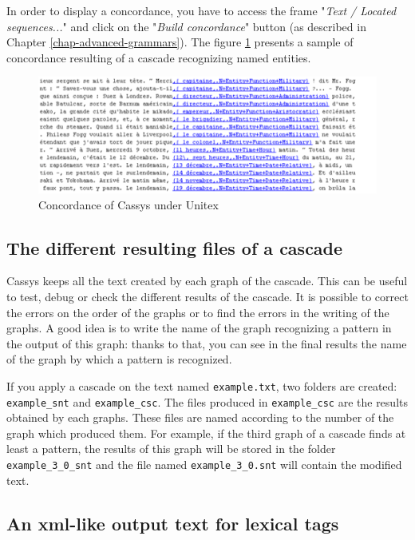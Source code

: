\bigskip
\noindent In order to display a concordance, you have to access the frame "\textit{Text / Located sequences...}" and click on the "\textit{Build concordance}" button (as described in Chapter \ref{chap-advanced-grammars}).
The figure \ref{fig13-04} presents a sample of concordance resulting of a cascade recognizing named entities. 
\begin{figure}[!htb]
  \centering
  \includegraphics[width=14cm]{resources/img/fig13-04.png}
  \caption{Concordance of Cassys under Unitex}
  \label{fig13-04}
\end{figure}

\subsection{The different resulting files of a cascade}

Cassys keeps all the text created by each graph of the cascade. This can be useful to test, debug or check the different results of the cascade. It is possible to correct the errors on the order of the graphs or to find the errors in the writing of the graphs. A good idea is to write the name of the graph recognizing a pattern in the output of this graph: thanks to that, you can see in the final results the name of the graph by which a pattern is recognized. 
\bigskip

If you apply a cascade on the text named \texttt{example.txt}, two folders are created: \texttt{example\_snt} and \texttt{example\_csc}.
The files produced in \texttt{example\_csc} are the results obtained by each graphs. These files are named according to the number of the graph which produced them. For example, if the third graph of a cascade finds at least a pattern, the results of this graph will be stored in the folder  \texttt{example\_3\_0\_snt} and the file named \texttt{example\_3\_0.snt} will contain the modified text.

\subsection{An xml-like output text for lexical tags}

